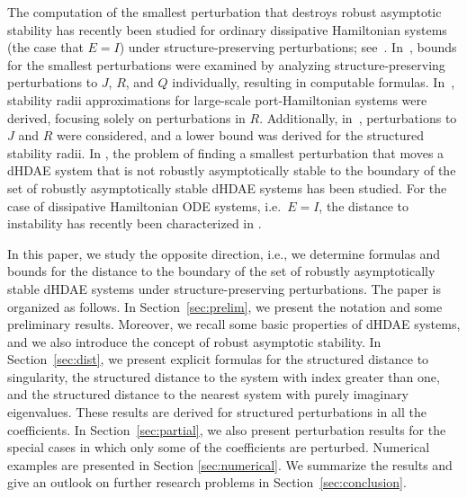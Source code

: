 \documentclass[11pt]{article}
\begin{document}
The computation of the smallest perturbation that destroys robust asymptotic stability has recently been studied for ordinary dissipative Hamiltonian systems  (the case that $E=I$) under structure-preserving perturbations; see~\cite{MehMS17,MehMW21}. In~\cite{MehMS16}, bounds for the smallest perturbations were examined by analyzing structure-preserving perturbations to $J$, $R$, and $Q$ individually, resulting in computable formulas. In~\cite{AliMM20}, stability radii approximations for large-scale port-Hamiltonian systems were derived, focusing solely on perturbations in $R$. Additionally, in~\cite{BagGS21}, perturbations to $J$ and $R$ were considered, and a lower bound was derived for the structured stability radii.
In \cite{GilMS18}, the problem  of finding a smallest perturbation that moves a dHDAE system that is not robustly asymptotically stable to the boundary of the set of  robustly asymptotically stable dHDAE systems has been studied.
For the case of dissipative Hamiltonian ODE systems, i.e.\ $E=I$, the distance to instability has recently  been characterized in \cite{BenMPS25}.


In this paper, we study the opposite direction, i.e., we determine formulas and bounds for the distance to the boundary
of the set of robustly asymptotically  stable  dHDAE systems under structure-preserving perturbations.
The paper is organized as follows.
In Section~\ref{sec:prelim}, we present the notation and some preliminary results. Moreover, we  recall some basic properties of dHDAE systems, and we also introduce the concept of robust asymptotic stability.
In Section~\ref{sec:dist}, we present explicit formulas for the structured distance to singularity, the structured distance to the system with index greater than one, and the structured distance to the nearest system with purely imaginary eigenvalues. These results are derived for structured perturbations in all the coefficients. In Section~\ref{sec:partial}, we also present perturbation results for the special cases in which only some of the coefficients are perturbed. Numerical examples are presented in Section \ref{sec:numerical}. We summarize the results and give an outlook on further research problems in Section~\ref{sec:conclusion}.
\end{document}
